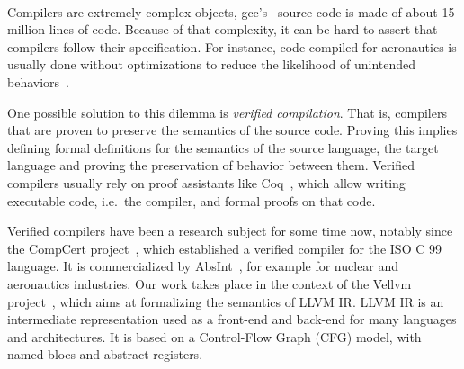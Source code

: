 \documentclass[11pt]{article}
\begin{document}






\paragraph{}
Compilers are extremely complex objects, gcc's~\cite{?} source code is made of about 15 million lines of code. Because of that complexity, it can be hard to assert that compilers follow their specification. For instance, code compiled for aeronautics is usually done without optimizations to reduce the likelihood of unintended behaviors~\cite{?}.

One possible solution to this dilemma is \emph{verified compilation}. That is, compilers that are proven to preserve the semantics of the source code. Proving this implies defining formal definitions for the semantics of the source language, the target language and proving the preservation of behavior between them. Verified compilers usually rely on proof assistants like Coq~\cite{?}, which allow writing executable code, i.e.\ the compiler, and formal proofs on that code.

Verified compilers have been a research subject for some time now, notably since the CompCert project~\cite{?}, which established a verified compiler for the ISO C 99 language. It is commercialized by AbsInt~\cite{?}, for example for nuclear and aeronautics industries. Our work takes place in the context of the Vellvm project~\cite{?}, which aims at formalizing the semantics of LLVM IR\@. LLVM IR is an intermediate representation used as a front-end and back-end for many languages and architectures. It is based on a Control-Flow Graph (CFG) model, with named blocs and abstract registers.
\end{document}
